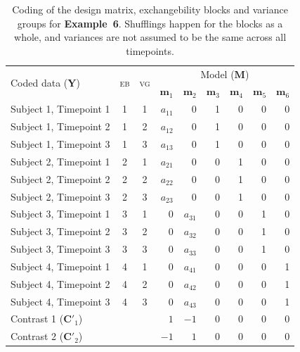 \begin{table}[!t]
\caption[Coding for Example 6]{Coding of the design matrix, exchangebility blocks and variance groups for \textbf{Example~6}. Shufflings happen for the blocks as a whole, and variances are not assumed to be the same across all timepoints.}
\begin{center}
{\small
\begin{tabular}{@{}lccrrrrrr@{}}
\toprule
\multirow{2}{*}{\vspace*{-1.7mm}Coded data ($\mathbf{Y}$)} & \multirow{2}{*}{\vspace*{-1.7mm}\textsc{eb}} & \multirow{2}{*}{\vspace*{-1.7mm}\textsc{vg}} & \multicolumn{6}{c}{Model ($\mathbf{M}$)\hspace*{-6mm}}\\
\cmidrule(l){4-9}
& & & $\mathbf{m}_1$ & $\mathbf{m}_2$ & $\mathbf{m}_3$ & $\mathbf{m}_4$ & $\mathbf{m}_5$ & $\mathbf{m}_6$\\
\midrule
Subject 1, Timepoint 1 & 1 & 1 & $a_{11}$ & 0 & 1 & 0 & 0 & 0\\
Subject 1, Timepoint 2 & 1 & 2 & $a_{12}$ & 0 & 1 & 0 & 0 & 0\\
Subject 1, Timepoint 3 & 1 & 3 & $a_{13}$ & 0 & 1 & 0 & 0 & 0\\
Subject 2, Timepoint 1 & 2 & 1 & $a_{21}$ & 0 & 0 & 1 & 0 & 0\\
Subject 2, Timepoint 2 & 2 & 2 & $a_{22}$ & 0 & 0 & 1 & 0 & 0\\
Subject 2, Timepoint 3 & 2 & 3 & $a_{23}$ & 0 & 0 & 1 & 0 & 0\\
Subject 3, Timepoint 1 & 3 & 1 & 0 & $a_{31}$ & 0 & 0 & 1 & 0\\
Subject 3, Timepoint 2 & 3 & 2 & 0 & $a_{32}$ & 0 & 0 & 1 & 0\\
Subject 3, Timepoint 3 & 3 & 3 & 0 & $a_{33}$ & 0 & 0 & 1 & 0\\
Subject 4, Timepoint 1 & 4 & 1 & 0 & $a_{41}$ & 0 & 0 & 0 & 1\\
Subject 4, Timepoint 2 & 4 & 2 & 0 & $a_{42}$ & 0 & 0 & 0 & 1\\
Subject 4, Timepoint 3 & 4 & 3 & 0 & $a_{43}$ & 0 & 0 & 0 & 1\\
\midrule
Contrast 1 ($\mathbf{C}'_1$) & & & $1$ & $-1$ & 0 & 0 & 0 & 0\\
Contrast 2 ($\mathbf{C}'_2$) & & & $-1$ & $1$ & 0 & 0 & 0 & 0\\
\bottomrule
\end{tabular}}
\end{center}
\label{tab:ex_longitudinal}
\end{table}

